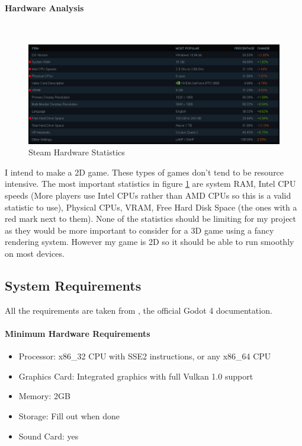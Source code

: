 \documentclass{article}
\newcommand{\myparagraph}[1]{\paragraph{#1}\mbox{}\\} %
\begin{document}
\myparagraph{Hardware Analysis}
\begin{figure}[h]
\centering
\includegraphics[width = 0.4\textheight]{steamSurvey}
\caption{\cite{SHS} Steam Hardware Statistics}
\label{steam statistics}
\end{figure}

I intend to make a 2D game. These types of games don't tend to be resource intensive. The most important statistics in figure \ref{steam statistics} are system RAM, Intel CPU speeds (More players use Intel CPUs rather than AMD CPUs so this is a valid statistic to use), Physical CPUs, VRAM, Free Hard Disk Space (the ones with a red mark next to them). None of the statistics should be limiting for my project as they would be more important to consider for a 3D game using a fancy rendering system. However my game is 2D so it should be able to run smoothly on most devices.

\subsection{System Requirements}
All the requirements are taken from \cite{spec}, the official Godot 4 documentation.
\paragraph{Minimum Hardware Requirements}
\begin{itemize}
\item Processor: x86\_32 CPU with SSE2 instructions, or any x86\_64 CPU 
\item Graphics Card: Integrated graphics with full Vulkan 1.0 support 
\item Memory: 2GB
\item Storage: Fill out when done
\item Sound Card: yes
\end{itemize}
\end{document}
